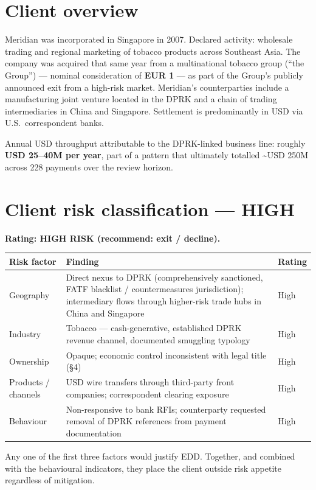 \documentclass[10.5pt]{article}
\begin{document}
\section{Client overview}
Meridian was incorporated in Singapore in 2007. Declared activity: wholesale trading and regional marketing of tobacco products across Southeast Asia. The company was acquired that same year from a multinational tobacco group (``the Group'') --- nominal consideration of \textbf{EUR 1} --- as part of the Group's publicly announced exit from a high-risk market. Meridian's counterparties include a manufacturing joint venture located in the DPRK and a chain of trading intermediaries in China and Singapore. Settlement is predominantly in USD via U.S.\ correspondent banks.

Annual USD throughput attributable to the DPRK-linked business line: roughly \textbf{USD 25--40M per year}, part of a pattern that ultimately totalled \textasciitilde USD 250M across 228 payments over the review horizon.

\section{Client risk classification --- HIGH}
\textbf{Rating: HIGH RISK (recommend: exit / decline).}

\renewcommand{\arraystretch}{1.25}
\begin{longtable}{@{}L{3.1cm}L{9cm}L{1.8cm}@{}}
\toprule
\textbf{Risk factor} & \textbf{Finding} & \textbf{Rating} \\
\midrule
Geography & Direct nexus to DPRK (comprehensively sanctioned, FATF blacklist / countermeasures jurisdiction); intermediary flows through higher-risk trade hubs in China and Singapore & High \\
Industry & Tobacco --- cash-generative, established DPRK revenue channel, documented smuggling typology & High \\
Ownership & Opaque; economic control inconsistent with legal title (\S4) & High \\
Products / channels & USD wire transfers through third-party front companies; correspondent clearing exposure & High \\
Behaviour & Non-responsive to bank RFIs; counterparty requested removal of DPRK references from payment documentation & High \\
\bottomrule
\end{longtable}

Any one of the first three factors would justify EDD. Together, and combined with the behavioural indicators, they place the client outside risk appetite regardless of mitigation.
\end{document}
